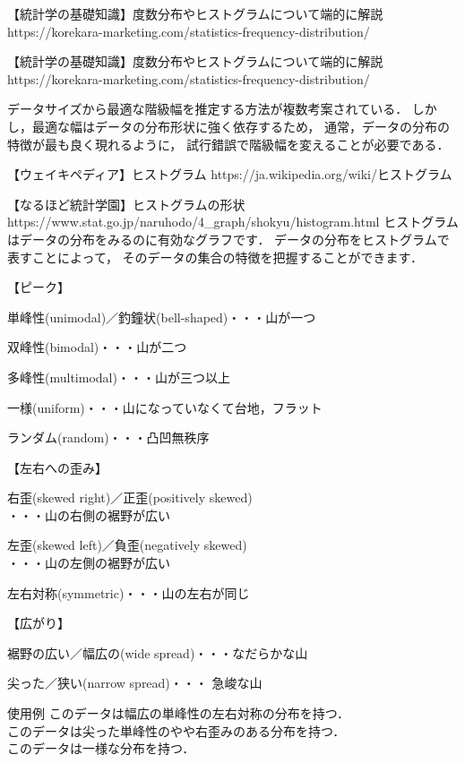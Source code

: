 \MyFrame{}
{
  \MyRef
  {【統計学の基礎知識】度数分布やヒストグラムについて端的に解説 }
  {https://korekara-marketing.com/statistics-frequency-distribution/}
}

{
  \MyRef
  {【統計学の基礎知識】度数分布やヒストグラムについて端的に解説 }
  {https://korekara-marketing.com/statistics-frequency-distribution/}
}

{
}

{
  データサイズから最適な階級幅を推定する方法が複数考案されている．
  しかし，最適な幅はデータの分布形状に強く依存するため，
  通常，データの分布の特徴が最も良く現れるように，
  試行錯誤で階級幅を変えることが必要である．
}

\MyFrame{}
{
  \MyRef
  {【ウェイキペディア】ヒストグラム}
  {https://ja.wikipedia.org/wiki/ヒストグラム}
}

{
  \MyRef
  {【なるほど統計学園】ヒストグラムの形状}
  {https://www.stat.go.jp/naruhodo/4_graph/shokyu/histogram.html}
}
\note
{
  ヒストグラムはデータの分布をみるのに有効なグラフです．
  データの分布をヒストグラムで表すことによって，
  そのデータの集合の特徴を把握することができます．
}

{
  【ピーク】
  \MyItems
  {
   \item 単峰性(unimodal)／釣鐘状(bell-shaped)・・・山が一つ
   \item 双峰性(bimodal)・・・山が二つ
   \item 多峰性(multimodal)・・・山が三つ以上
   \item 一様(uniform)・・・山になっていなくて台地，フラット
   \item ランダム(random)・・・凸凹無秩序
  }
}

{
【左右への歪み】
  \MyItems
  {
   \item 右歪(skewed right)／正歪(positively skewed)\\
     ・・・山の右側の裾野が広い
   \item 左歪(skewed left)／負歪(negatively skewed)\\
     ・・・山の左側の裾野が広い
   \item 左右対称(symmetric)・・・山の左右が同じ
  }
}

{
【広がり】
  \MyItems
  {
   \item 裾野の広い／幅広の(wide spread)・・・なだらかな山
   \item 尖った／狭い(narrow spread)・・・ 急峻な山
  }
  \begin{itembox}{使用例}
    このデータは幅広の単峰性の左右対称の分布を持つ．\\
    このデータは尖った単峰性のやや右歪みのある分布を持つ．\\
    このデータは一様な分布を持つ．
  \end{itembox}
}

